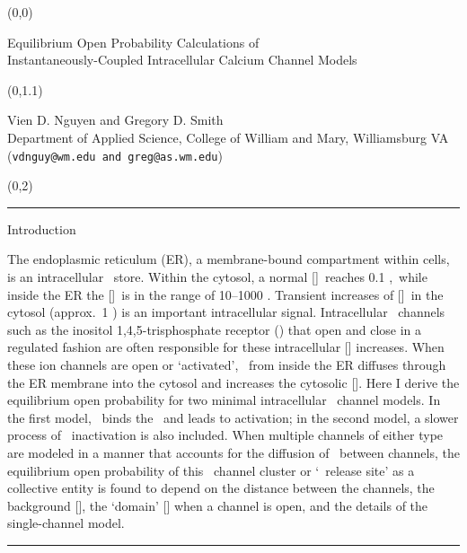 \documentclass[a0]{a0poster}
\def\CHead#1{\begin{center} {\LARGE\color{DarkBlue} #1} \end{center} \bigskip}
\def\Title#1{\begin{center} {\VeryHuge\color{Red} #1} \end{center} }
\begin{document}
\begin{textblock}{23}(0,0)

\Title{ Equilibrium Open Probability Calculations of \\[0.1in] Instantaneously-Coupled Intracellular Calcium Channel Models } 

\end{textblock}

\begin{textblock}{23}(0,1.1)
\CHead{Vien D. Nguyen and Gregory D. Smith\\
Department of Applied Science, College of William and Mary, Williamsburg VA\\
({\tt vdnguy@wm.edu and greg@as.wm.edu})}
\end{textblock}





\begin{textblock}{7}(0,2)
\hrule\medskip
\CHead{Introduction}

The endoplasmic reticulum (ER), a membrane-bound compartment within cells,
is an intracellular \Ca\ store.  
Within the cytosol, a normal [\Ca]\ reaches 0.1 \UM,\ while inside the ER the [\Ca]\ is in the range
of 10--1000 \UM.  
Transient increases of [\Ca]\ in the cytosol (approx.\ 1 \UM) is an important intracellular signal. 
Intracellular \Ca\ channels such as the inositol 1,4,5-trisphosphate receptor (\Ipr) that open and close 
in a \Ca\-regulated fashion are often responsible for these intracellular [\Ca] increases. When these ion channels are 
open or `activated', \Ca\ from inside the ER diffuses through the ER membrane into the cytosol and increases the 
cytosolic [\Ca]. Here I derive the equilibrium open probability for two minimal intracellular \Ca\ channel models.  
In the first model, \Ca\ binds the \Ipr\ and leads to activation; in the second model, a slower process of 
\Ca\ inactivation is also included.  When multiple channels of either type are modeled in a manner that accounts for 
the diffusion of \Ca\ between channels, the equilibrium open probability of this \Ca\ channel cluster or `\Ca\ release site' 
as a collective entity is found to depend on the distance between the channels, the background [\Ca], the `domain' [\Ca] 
when a channel is open, and the details of the single-channel model.



\bigskip
\hrule
\end{textblock}
\end{document}
